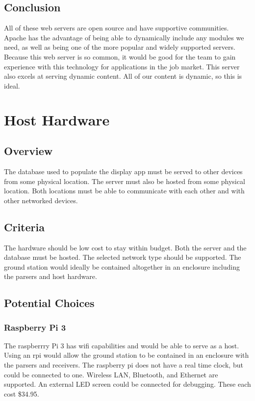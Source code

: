 \documentclass[onecolumn, draftclsnofoot,10pt, compsoc]{IEEEtran}
\begin{document}
\subsection{Conclusion}
All of these web servers are open source and have supportive communities.
Apache has the advantage of being able to dynamically include any modules we need, as well as being one of the more popular and widely supported servers. 
Because this web server is so common, it would be good for the team to gain experience with this technology for applications in the job market.
This server also excels at serving dynamic content. 
All of our content is dynamic, so this is ideal.


\section{Host Hardware}

\subsection{Overview}
 The database used to populate the display app must be served to other devices from some physical location.
 The server must also be hosted from some physical location.
 Both locations must be able to communicate with each other and with other networked devices.

\subsection{Criteria}
The hardware should be low cost to stay within budget.
Both the server and the database must be hosted.
The selected network type should be supported.
The ground station would ideally be contained altogether in an enclosure including the parsers and host hardware.

\subsection{Potential Choices}

\subsubsection{Raspberry Pi 3}
 The raspberrry Pi 3 has wifi capabilities and would be able to serve as a host.
 Using an rpi would allow the ground station to be contained in an enclosure with the parsers and receivers.
 The raspberry pi does not have a real time clock, but could be connected to one.
 Wireless LAN, Bluetooth, and Ethernet are supported.
 An external LED screen could be connected for debugging.
 These each cost \$34.95. \cite{6}
 
\end{document}
